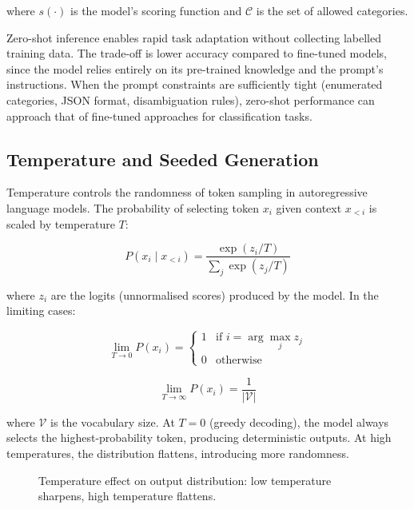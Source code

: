 \documentclass[10pt,a4paper]{article}
\begin{document}
where $s(\cdot)$ is the model's scoring function and $\mathcal{C}$ is the set of allowed categories.

Zero-shot inference enables rapid task adaptation without collecting labelled training data. The trade-off is lower accuracy compared to fine-tuned models, since the model relies entirely on its pre-trained knowledge and the prompt's instructions. When the prompt constraints are sufficiently tight (enumerated categories, JSON format, disambiguation rules), zero-shot performance can approach that of fine-tuned approaches for classification tasks.

\subsection{Temperature and Seeded Generation}
\label{sec:temperature}

Temperature controls the randomness of token sampling in autoregressive language models. The probability of selecting token $x_i$ given context $x_{<i}$ is scaled by temperature $T$:

\begin{equation}
P(x_i \mid x_{<i}) = \frac{\exp(z_i / T)}{\sum_j \exp(z_j / T)}
\label{eq:temperature}
\end{equation}

where $z_i$ are the logits (unnormalised scores) produced by the model. In the limiting cases:

\begin{equation}
\lim_{T \to 0} P(x_i) = \begin{cases} 1 & \text{if } i = \arg\max_j z_j \\ 0 & \text{otherwise} \end{cases}
\label{eq:temp-zero}
\end{equation}

\begin{equation}
\lim_{T \to \infty} P(x_i) = \frac{1}{|\mathcal{V}|}
\label{eq:temp-infinity}
\end{equation}

where $\mathcal{V}$ is the vocabulary size. At $T = 0$ (greedy decoding), the model always selects the highest-probability token, producing deterministic outputs. At high temperatures, the distribution flattens, introducing more randomness.

\begin{figure}[H]
    \centering
    \caption{Temperature effect on output distribution: low temperature sharpens, high temperature flattens.}
    \label{fig:temperature-effect}
\end{figure}
\end{document}
